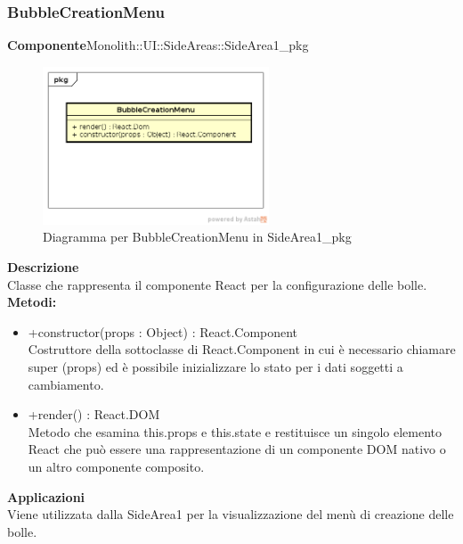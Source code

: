 \clearpage

\subsubsection{BubbleCreationMenu}
\textbf{Componente}Monolith::UI::SideAreas::SideArea1\_pkg\\
   \FloatBarrier
   \begin{figure}[ht]
   \centering
   \includegraphics[width=0.6\textwidth]{img/single-BubbleCreationMenu}
   \caption{{Diagramma per BubbleCreationMenu in SideArea1\_pkg}}
\end{figure}
\FloatBarrier
\textbf{Descrizione}\\
Classe che rappresenta il componente React per la configurazione delle bolle.
\textbf{Metodi:} \begin{itemize}\item +constructor(props : Object) : React.Component \\Costruttore della sottoclasse di React.Component in cui è necessario chiamare super (props) ed è possibile inizializzare lo stato per i dati soggetti a cambiamento.\item +render() : React.DOM \\Metodo che esamina this.props e this.state e restituisce un singolo elemento React che può essere una rappresentazione di un componente DOM nativo o un altro componente composito.\end{itemize} 


\textbf{Applicazioni}\\
Viene utilizzata dalla SideArea1 per la visualizzazione del menù di creazione delle bolle. 


\clearpage

